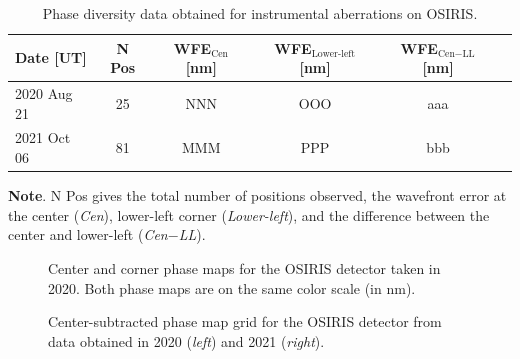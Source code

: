 \documentclass[]{spie}  %
\begin{document}
\begin{table}[!h]
\centering
\caption{Phase diversity data obtained for instrumental aberrations on OSIRIS.}
\begin{center}
\begin{tabular}{lccccc}
\hline
        Date [UT] &  N Pos &  WFE$_{\textrm{Cen}}$ [nm] &  WFE$_{\textrm{Lower-left}}$ [nm] & WFE$_{\textrm{Cen}-\textrm{LL}}$ [nm] \\\hline\hline
        2020 Aug 21 & 25 & NNN & OOO & aaa\\
        2021 Oct 06 & 81 & MMM & PPP & bbb\\\hline
\end{tabular}
\end{center}
{\raggedright \footnotesize{\textbf{Note}. N Pos gives the total number of positions observed, the wavefront error at the center (\textit{Cen}), lower-left corner (\textit{Lower-left}), and the difference between the center and lower-left (\textit{Cen}$-$\textit{LL}).}\par}
\label{tab:fields-metrics}
\end{table}

\begin{figure}[!h]
 \hspace{1cm}
 \caption{\footnotesize Center and corner phase maps for the OSIRIS detector taken in 2020. Both phase maps are on the same color scale (in nm). \label{fig:phase-map-cencorn}}
\end{figure}

\begin{figure}[!h]
 \hspace{5mm}
 \caption{\footnotesize Center-subtracted phase map grid for the OSIRIS detector from data obtained in 2020 (\textit{left}) and 2021 (\textit{right}). \label{fig:phase-map-grid}}
\end{figure}
\end{document}
